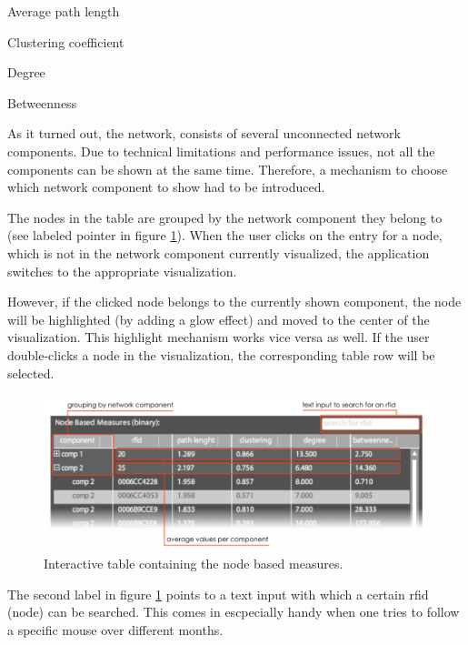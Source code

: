 \begin{mylist}
\item Average path length
\item Clustering coefficient
\item Degree
\item Betweenness
\end{mylist}

As it turned out, the network, consists of several unconnected network components. Due to technical limitations and performance issues, not all the components can be shown at the same time. Therefore, a mechanism to choose which network component to show had to be introduced.

The nodes in the table are grouped by the network component they belong to (see labeled pointer in figure \ref{fig:node_based_measures}). When the user clicks on the entry for a node, which is not in the network component currently visualized, the application switches to the appropriate visualization.

However, if the clicked node belongs to the currently shown component, the node will be highlighted (by adding a glow effect) and moved to the center of the visualization. This highlight mechanism works vice versa as well. If the user double-clicks a node in the visualization, the corresponding table row will be selected.

\begin{figure}[!htpb]
\begin{center}
  \includegraphics[width=\textwidth]{assets/pdf/node_based_measures.pdf}
  \caption[Node based measures]{Interactive table containing the node based measures.}
  \label{fig:node_based_measures}
\end{center}
\end{figure}

The second label in figure \ref{fig:node_based_measures} points to a text input with which a certain rfid (node) can be searched. This comes in escpecially handy when one tries to follow a specific mouse over different months.    

